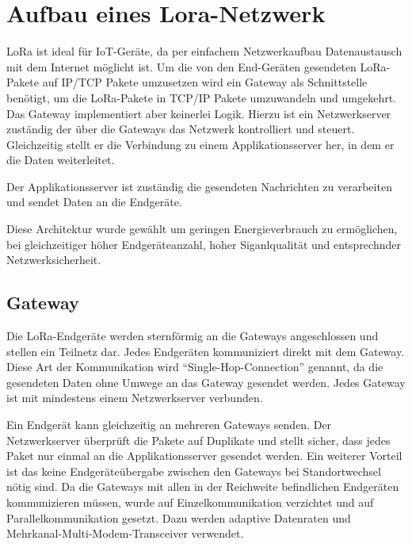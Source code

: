 \documentclass[a4paper,12pt]{article}
\begin{document}
    \section{Aufbau eines Lora-Netzwerk}
        LoRa ist ideal für IoT-Geräte, da per einfachem Netzwerkaufbau Datenaustausch mit dem Internet möglicht ist.
        Um die von den End-Geräten gesendeten LoRa-Pakete auf IP/TCP Pakete umzusetzen wird ein Gateway als Schnittstelle
        benötigt, um die LoRa-Pakete in TCP/IP Pakete umzuwandeln und umgekehrt.
        Das Gateway implementiert aber keinerlei Logik. Hierzu ist ein Netzwerkserver zuständig der über die 
        Gateways das Netzwerk kontrolliert und steuert. Gleichzeitig stellt er die Verbindung zu einem 
        Applikationsserver her, in dem er die Daten weiterleitet.

        Der Applikationsserver ist zuständig die gesendeten Nachrichten zu verarbeiten und sendet Daten an die 
        Endgeräte.

        Diese Architektur wurde gewählt um geringen Energieverbrauch zu ermöglichen, bei gleichzeitiger 
        höher Endgeräteanzahl, hoher Siganlqualität und entsprechnder Netzwerksicherheit. \cite[S. 8 ff.]{WhatIsLoRa}
        
        \subsection{Gateway}
            Die LoRa-Endgeräte werden sternförmig an die Gateways angeschlossen und stellen ein Teilnetz dar. 
            Jedes Endgeräten kommuniziert direkt mit dem Gateway. Diese Art der Kommunikation wird  
            ``Single-Hop-Connection'' genannt, da die gesendeten Daten ohne Umwege an das Gateway gesendet werden. 
            Jedes Gateway ist mit mindestens einem Netzwerkserver verbunden.
        
            Ein Endgerät kann gleichzeitig an mehreren Gateways senden. Der Netzwerkserver überprüft die Pakete 
            auf Duplikate und stellt sicher, dass jedes Paket nur einmal an die Applikationsserver gesendet werden.
            Ein weiterer Vorteil ist das keine Endgeräteübergabe zwischen den Gateways bei Standortwechsel nötig sind.
            Da die Gateways mit allen in der Reichweite befindlichen Endgeräten kommunizieren müssen, wurde 
            auf Einzelkommunikation verzichtet und auf Parallelkommunikation gesetzt. 
            Dazu werden adaptive Datenraten und Mehrkanal-Multi-Modem-Transceiver verwendet.
        
\end{document}
